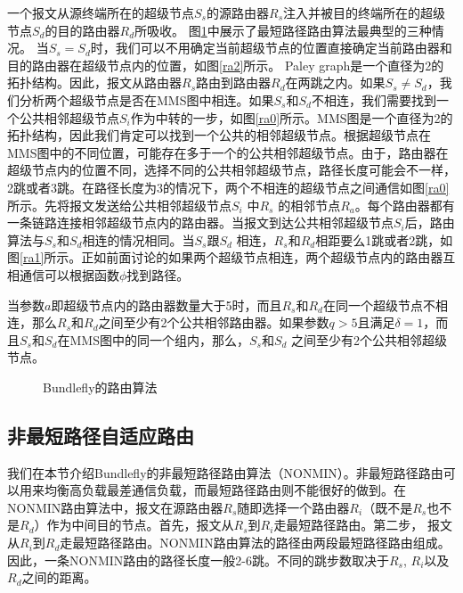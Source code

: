 一个报文从源终端所在的超级节点$S_s$的源路由器$R_s$注入并被目的终端所在的超级节点$S_d$的目的路由器$R_d$所吸收。
图\ref{ra}中展示了最短路径路由算法最典型的三种情况。
当$S_s=S_d$时，我们可以不用确定当前超级节点的位置直接确定当前路由器和目的路由器在超级节点内的位置，如图\ref{ra2}所示。
Paley graph是一个直径为2的拓扑结构。因此，报文从路由器$R_s$路由到路由器$R_d$在两跳之内。如果$S_s \neq S_d$，我们分析两个超级节点是否在MMS图中相连。如果$S_s$和$S_d$不相连，我们需要找到一个公共相邻超级节点$S_i$作为中转的一步，如图\ref{ra0}所示。MMS图是一个直径为2的拓扑结构，因此我们肯定可以找到一个公共的相邻超级节点。根据超级节点在MMS图中的不同位置，可能存在多于一个的公共相邻超级节点。由于，路由器在超级节点内的位置不同，选择不同的公共相邻超级节点，路径长度可能会不一样，2跳或者3跳。在路径长度为3的情况下，两个不相连的超级节点之间通信如图\ref{ra0}所示。先将报文发送给公共相邻超级节点$S_i$ 中$R_s$ 的相邻节点$R_a$。每个路由器都有一条链路连接相邻超级节点内的路由器。当报文到达公共相邻超级节点$S_i$后，路由算法与$S_s$和$S_d$相连的情况相同。当$S_s$跟$S_d$ 相连，$R_s$和$R_d$相距要么1跳或者2跳，如图\ref{ra1}所示。正如前面讨论的如果两个超级节点相连，两个超级节点内的路由器互相通信可以根据函数$\phi$找到路径。

当参数$a$即超级节点内的路由器数量大于5时，而且$R_s$和$R_d$在同一个超级节点不相连，那么$R_s$和$R_d$之间至少有2个公共相邻路由器。如果参数$q>5$且满足$\delta=1$，而且$S_s$和$S_d$在MMS图中的同一个组内，那么，$S_s$和$S_d$ 之间至少有2个公共相邻超级节点。



\begin{figure}[t]
\setlength{\belowcaptionskip}{-.5cm}%
\centering
  \vspace{-.3cm}
  \caption{Bundlefly的路由算法}
  \label{ra}
\end{figure}

\subsection{非最短路径自适应路由}

我们在本节介绍Bundlefly的非最短路径路由算法（NONMIN）。非最短路径路由可以用来均衡高负载最差通信负载，而最短路径路由则不能很好的做到。在NONMIN路由算法中，报文在源路由器$R_s$随即选择一个路由器$R_i$（既不是$R_s$也不是$R_d$）作为中间目的节点。首先，报文从$R_s$到$R_i$走最短路径路由。第二步，
报文从$R_i$到$R_d$走最短路径路由。NONMIN路由算法的路径由两段最短路径路由组成。因此，一条NONMIN路由的路径长度一般2-6跳。不同的跳步数取决于$R_s$,
$R_i$以及$R_d$之间的距离。

